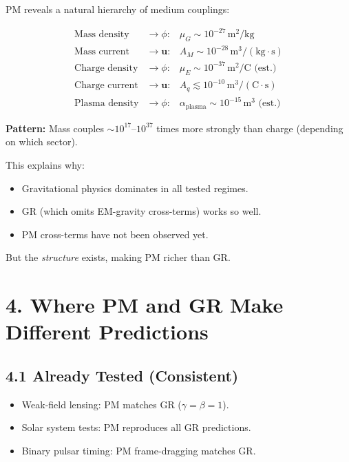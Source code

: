 \documentclass{article}
\begin{document}
PM reveals a natural hierarchy of medium couplings:



\[
\begin{array}{lcl}
\text{Mass density} & \rightarrow \phi: & \mu_G \sim 10^{-27}\,\text{m}^2/\text{kg} \\
\text{Mass current} & \rightarrow \mathbf u: & A_M \sim 10^{-28}\,\text{m}^3/(\text{kg}\cdot\text{s}) \\
\text{Charge density} & \rightarrow \phi: & \mu_E \sim 10^{-37}\,\text{m}^2/\text{C} \text{ (est.)} \\
\text{Charge current} & \rightarrow \mathbf u: & A_q \lesssim 10^{-10}\,\text{m}^3/(\text{C}\cdot\text{s}) \\
\text{Plasma density} & \rightarrow \phi: & \alpha_{\text{plasma}} \sim 10^{-15}\,\text{m}^3 \text{ (est.)}
\end{array}
\]



\textbf{Pattern:} Mass couples $\sim 10^{17}$--$10^{37}$ times more strongly
than charge (depending on which sector).

This explains why:

\begin{itemize}
    \item Gravitational physics dominates in all tested regimes.
    \item GR (which omits EM-gravity cross-terms) works so well.
    \item PM cross-terms have not been observed yet.
\end{itemize}

But the \emph{structure} exists, making PM richer than GR.

\section*{4. Where PM and GR Make Different Predictions}

\subsection*{4.1 Already Tested (Consistent)}

\begin{itemize}
    \item Weak-field lensing: PM matches GR ($\gamma = \beta = 1$).
    \item Solar system tests: PM reproduces all GR predictions.
    \item Binary pulsar timing: PM frame-dragging matches GR.
\end{itemize}
\end{document}
